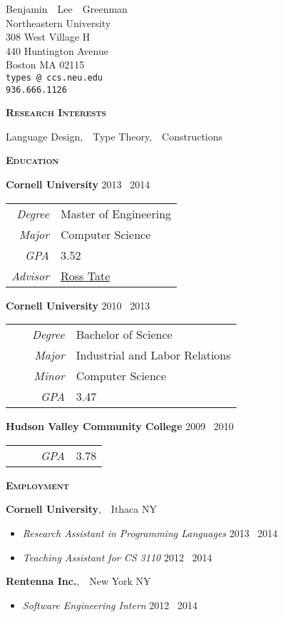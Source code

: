 \documentclass{article}
\makeatletter
\renewcommand{\maketitle}{
\begin{center}
  {\large{Benjamin~~Lee~~Greenman}}
\vspace{0.1cm}
\\Northeastern University
\\308 West Village H
\\440 Huntington Avenue
\\Boston MA 02115
\\\texttt{\fontseries{m}types\,@\,ccs.neu.edu}
\\\texttt{\fontseries{m}936.666.1126}
\end{center}
}
\newcommand{\mysection}[1]{\vspace{0.5cm}
\hspace{-1.3cm}\textsc{\textbf{#1}}~\hrulefill}
\makeatother
\begin{document}
\maketitle


\mysection{Research Interests}

Language Design,~~Type Theory,~~Constructions

\mysection{Education}

\textbf{Cornell University} \hfill 2013 \textendash\ 2014 \\
\begin{tabular}{>{\it}r l}
Degree & Master of Engineering\\
Major & Computer Science\\
GPA & 3.52\\
Advisor & \href{http://www.cs.cornell.edu/~ross/}{Ross Tate}
\end{tabular}

\textbf{Cornell University} \hfill 2010 \textendash\ 2013\\
\begin{tabular}{>{\it}r l}
Degree & Bachelor of Science\\
Major & Industrial and Labor Relations\\
Minor & Computer Science\\
~~~~~GPA & 3.47\\
\end{tabular}

\textbf{Hudson Valley Community College} \hfill 2009 \textendash\ 2010 \\ 
\begin{tabular}{>{\it}r l}
~~~~~GPA & 3.78\\
\end{tabular}

\mysection{Employment}

\textbf{Cornell University},~~Ithaca NY
\begin{itemize}[topsep=-0.2cm,itemsep=0.1cm]
\item \emph{Research Assistant in Programming Languages} \hfill 2013 \textendash\ 2014
\item \emph{Teaching Assistant for CS 3110} \hfill 2012 \textendash\ 2014
\end{itemize}

\textbf{Rentenna Inc.},~~New York NY
\begin{itemize}[topsep=-0.2cm,itemsep=0.1cm]
\item \emph{Software Engineering Intern} \hfill 2012 \textendash\ 2014
\end{itemize}
\end{document}
